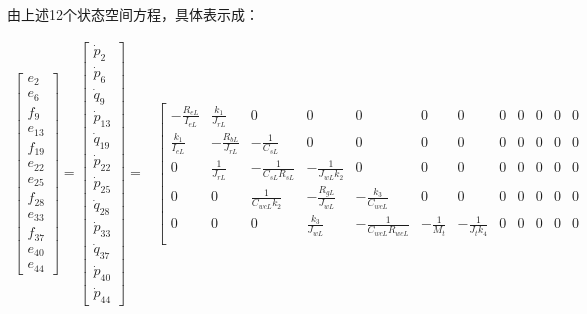 由上述12个状态空间方程，具体表示成：
\begin{small}
	\begin{equation}\label{1_matrix1}
	\begin{aligned}
	\left[ 
	\begin{array}
	{l}{e_{2}} \\ {e_{6}}\\ {f_{9}} \\ {e_{13}}\\ {f_{19}} \\ {e_{22}} \\ {e_{25}} \\ {f_{28}} \\ {e_{33}} \\ {f_{37}} \\ {e_{40}}\\ {e_{44}}
	\end{array}
	\right] 
	=
	\left[ 
	\begin{array}
	{c}{\dot{p}_{2}} \\ {\dot{p}_{6}} \\ {\dot{q}_{9}}\\ {\dot{p}_{13}}\\ {\dot{q}_{19}}\\ {\dot{p}_{22}} \\ {\dot{p}_{25}}\\ {\dot{q}_{28}}\\ {\dot{p}_{33}}  \\ {\dot{q}_{37}} \\ {\dot{p}_{40}} \\ {\dot{p}_{44}} 
	\end{array}
	\right]
	=
    &\left[ 
	\begin{array}{cccccccccccc}
	{- \frac { R _ { eL}} { I _ { eL}  } } &  \frac {k _ { 1 }} { J _ { rL} }  &0& 0 & 0 & 0 & 0 & 0 & 0 & 0 & 0 & 0 \\
	\frac {k _ { 1 }} { I _ { e L }  } & - \frac {  R _ { bL} } { J _ { rL}  } &  - \frac { 1} { C _ { sL }  } & 0 & 0 & 0 & 0 & 0& 0 & 0 & 0 & 0  \\ 
	0  & \frac {1} { J _ { rL } }  & - \frac { 1} { C _ { sL }  R _ { s L}  } & - \frac { 1 } { J _ { w L }  k _ { 2 } }&0 & 0 & 0 & 0 & 0 & 0 & 0 & 0  \\ 
	0 & 0 & \frac{1}{C_{wc L}k_2} & - \frac {  R _ { gL }} { J _ { wL}  } & - \frac {k _ { 3 } } { C _ { w cL}  }  & 0 & 0 & 0 & 0 & 0 & 0 & 0   \\ 
	0 & 0 & 0 & \frac {  k _ { 3 }  } { J _ { w L }  } & - \frac {1} { C _ { w c L } R _ { w c L }   } &- \frac { 1 } { M _ { t } }  &  - \frac { 1} { J _ { t } k _ { 4 } } & 0 & 0 & 0 & 0 & 0  \\ 

\end{array}
\end{aligned}
\end{equation}
\end{small}
